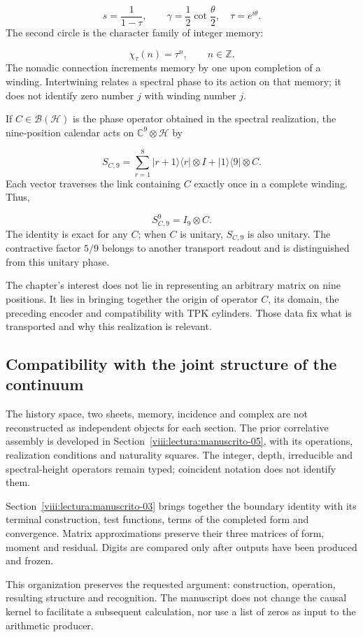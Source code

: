 \[
s=\frac1{1-\tau},\qquad
\gamma=\frac12\cot\frac{\theta}{2},\quad\tau=e^{i\theta}.
\]
The second circle is the character family of integer memory:

\[
\chi_\tau(n)=\tau^n,\qquad n\in\mathbb Z.
\]
The nonadic connection increments memory by one upon completion of a winding. Intertwining relates a spectral phase to its action on that memory; it does not identify zero number $j$ with winding number $j$.

If \(C\in\mathcal B(\mathcal H)\) is the phase operator obtained in the spectral realization, the nine-position calendar acts on \(\mathbb C^9\otimes\mathcal H\) by

\[
S_{C,9}=\sum_{r=1}^8|r+1\rangle\langle r|\otimes I
+|1\rangle\langle9|\otimes C.
\]
Each vector traverses the link containing $C$ exactly once in a complete winding. Thus,

\[
S_{C,9}^9=I_9\otimes C.
\]
The identity is exact for any $C$; when $C$ is unitary, $S_{C,9}$ is also unitary. The contractive factor $5/9$ belongs to another transport readout and is distinguished from this unitary phase.

The chapter's interest does not lie in representing an arbitrary matrix on nine positions. It lies in bringing together the origin of operator $C$, its domain, the preceding encoder and compatibility with TPK cylinders. Those data fix what is transported and why this realization is relevant.

\clearpage
\subsection{Compatibility with the joint structure of the continuum}
The history space, two sheets, memory, incidence and complex are not reconstructed as independent objects for each section. The prior correlative assembly is developed in Section~\ref{viii:lectura:manuscrito-05}, with its operations, realization conditions and naturality squares. The integer, depth, irreducible and spectral-height operators remain typed; coincident notation does not identify them.

Section~\ref{viii:lectura:manuscrito-03} brings together the boundary identity with its terminal construction, test functions, terms of the completed form and convergence. Matrix approximations preserve their three matrices of form, moment and residual. Digits are compared only after outputs have been produced and frozen.

This organization preserves the requested argument: construction, operation, resulting structure and recognition. The manuscript does not change the causal kernel to facilitate a subsequent calculation, nor use a list of zeros as input to the arithmetic producer.
